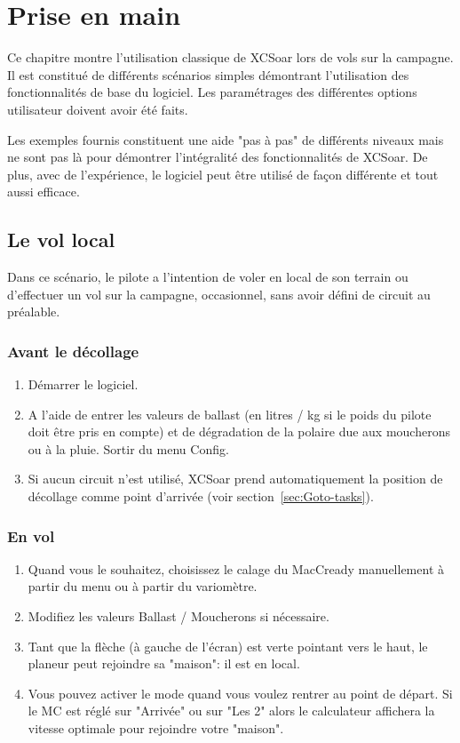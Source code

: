 \chapter{Prise en main}\label{cha:quickstart}

Ce chapitre montre l'utilisation classique de XCSoar lors de vols sur la campagne. Il est constitué de différents scénarios simples démontrant l'utilisation des fonctionnalités de base du logiciel. Les paramétrages des différentes options utilisateur doivent avoir été faits.

Les exemples fournis constituent une aide "pas à pas" de différents niveaux mais ne sont pas là pour démontrer  l'intégralité des fonctionnalités de XCSoar. De plus, avec de l'expérience, le logiciel peut être utilisé de façon différente et tout aussi efficace.

\section{Le vol local}\label{sec:local-flight}

Dans ce scénario, le pilote a l'intention de voler en local de son terrain ou d'effectuer un vol sur la campagne, occasionnel, sans avoir défini de circuit au préalable.

\subsection*{Avant le décollage}
\begin{enumerate}
\item  Démarrer le logiciel.
\item  A l'aide de \blink{} entrer les valeurs de ballast (en litres / kg si le poids du pilote doit être pris en compte) et de dégradation de la polaire due aux moucherons ou à la pluie. Sortir du menu Config.
\item  Si aucun circuit n'est utilisé, XCSoar prend automatiquement la position de décollage comme point d'arrivée (voir section~\ref{sec:Goto-tasks}). 
\end{enumerate}

\subsection*{En vol}
\begin{enumerate}
\item  Quand vous le souhaitez, choisissez le calage du MacCready manuellement à partir du menu 
\blink{} ou à partir du variomètre.
\item  Modifiez les valeurs Ballast / Moucherons si nécessaire.
\item  Tant que la flèche (à gauche de l'écran) est verte pointant vers le haut, le planeur peut rejoindre sa "maison": il est en local.
\item  Vous pouvez activer le mode  quand vous voulez rentrer au point de départ. Si le MC est réglé sur "Arrivée" ou sur "Les 2" alors le calculateur affichera la vitesse optimale pour rejoindre votre "maison".
\end{enumerate}

